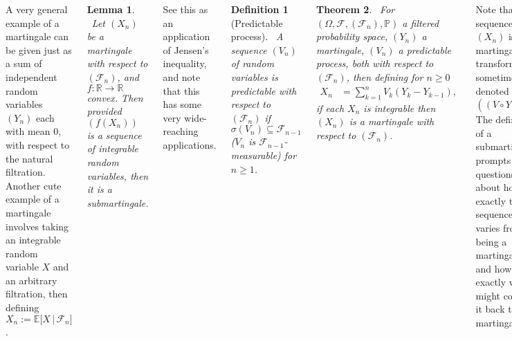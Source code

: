 \documentclass{tikzposter} %
\newtheorem{theorem}{Theorem}
\newtheorem{lemma}[theorem]{Lemma}
\newtheorem{definition}{Definition}
\begin{document}
\begin{columns}
{    A very general example of a martingale can be given just as a sum of independent random variables $(Y_{n})$ each with mean $0$, with respect to the natural filtration. Another cute example of a martingale involves taking an integrable random variable $X$ and an arbitrary filtration, then defining $X_{n} := \mathbb{E}\big[X \,|\, \mathcal{F}_{n}\big]$. \\

    \begin{lemma}
    \ Let $(X_{n})$ be a martingale with respect to $(\mathcal{F}_{n})$, and $f : \mathbb{R} \to \mathbb{R}$ convex. Then provided $(f(X_{n}))$ is a sequence of integrable random variables, then it is a submartingale.
    \end{lemma}
    \hphantom{}

    See this as an application of Jensen's inequality, and note that this has some very wide-reaching applications. \\

    \begin{definition}[Predictable process]
    \ A sequence $(V_{n})$ of random variables is predictable with respect to $(\mathcal{F}_{n})$ if $\sigma(V_{n}) \subseteq \mathcal{F}_{n-1}$ ($V_{n}$ is $\mathcal{F}_{n-1}$-measurable) for $n \ge 1$.
    \end{definition}
    \hphantom{}

    \begin{theorem}
    \ For $(\Omega, \mathcal{F}, (\mathcal{F}_{n}), \mathbb{P})$ a filtered probability space, $(Y_{n})$ a martingale, $(V_{n})$ a predictable process, both with respect to $(\mathcal{F}_{n})$, then defining for $n \ge 0$
    \begin{align*}
      X_{n} &= \sum_{k=1}^{n} V_{k}(Y_{k}-Y_{k-1}),
    \end{align*}
    if each $X_{n}$ is integrable then $(X_{n})$ is a martingale with respect to $(\mathcal{F}_{n})$.
    \end{theorem}
    \hphantom{}

    Note that the sequence $(X_{n})$ is a martingale transform, sometimes denoted $((V \circ Y)_{n})$. \\

    The definition of a submartingale prompts some questions about how exactly the sequence varies from being a martingale, and how exactly we might correct it back to a martingale. \\

}
\end{columns}
\end{document}
